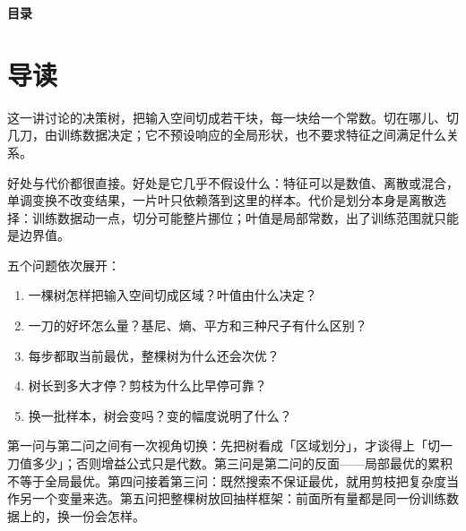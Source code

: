\documentclass[11pt,a4paper,fontset=windows,zihao=-4]{ctexart}
\makeatletter
\renewcommand{\tableofcontents}{%
  \par\begingroup
    \sffamily\Large\bfseries\color{navy}目\quad 录\par
  \endgroup
  \vspace{0.85em}
  \setlength{\parskip}{0pt}%
  \@starttoc{toc}%
}
\makeatother
\begin{document}
\tableofcontents
\thispagestyle{plain}
\clearpage

\setcounter{page}{1}

\section*{导\quad 读}

这一讲讨论的决策树，把输入空间切成若干块，每一块给一个常数。切在哪儿、切几刀，由训练数据决定；它不预设响应的全局形状，也不要求特征之间满足什么关系。

好处与代价都很直接。好处是它几乎不假设什么：特征可以是数值、离散或混合，单调变换不改变结果，一片叶只依赖落到这里的样本。代价是划分本身是离散选择：训练数据动一点，切分可能整片挪位；叶值是局部常数，出了训练范围就只能是边界值。

五个问题依次展开：
\begin{enumerate}[label=\textcolor{navy}{\bfseries(\arabic*)},leftmargin=2.4em]
  \item 一棵树怎样把输入空间切成区域？叶值由什么决定？
  \item 一刀的好坏怎么量？基尼、熵、平方和三种尺子有什么区别？
  \item 每步都取当前最优，整棵树为什么还会次优？
  \item 树长到多大才停？剪枝为什么比早停可靠？
  \item 换一批样本，树会变吗？变的幅度说明了什么？
\end{enumerate}

第一问与第二问之间有一次视角切换：先把树看成「区域划分」，才谈得上「切一刀值多少」；否则增益公式只是代数。第三问是第二问的反面——局部最优的累积不等于全局最优。第四问接着第三问：既然搜索不保证最优，就用剪枝把复杂度当作另一个变量来选。第五问把整棵树放回抽样框架：前面所有量都是同一份训练数据上的，换一份会怎样。
\end{document}
